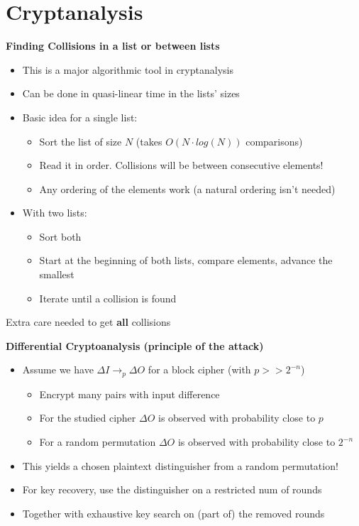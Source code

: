 

\chapter{Cryptanalysis}

\textbf{Finding Collisions in a list or between lists}
\begin{itemize}
    \item This is a major algorithmic tool in cryptanalysis
    \item Can be done in quasi-linear time in the lists’ sizes
    \item Basic idea for a single list:
    \begin{itemize}
        \item Sort the list of size $N$ (takes $O(N \cdot log(N))$ comparisons)
        \item Read it in order. Collisions will be between consecutive elements!
        \item Any ordering of the elements work (a natural ordering isn’t needed)
    \end{itemize}
    \item With two lists:
    \begin{itemize}
        \item Sort both
        \item Start at the beginning of both lists, compare elements, advance the smallest
        \item Iterate until a collision is found
    \end{itemize}
\end{itemize}
\begin{center}
    Extra care needed to get \textbf{all} collisions\newline
\end{center}


\textbf{Differential Cryptoanalysis (principle of the attack)}
\begin{itemize}
    \item Assume we have $\Delta I \to_p \Delta O$ for a block cipher (with $p >> 2^{-n}$)
    \begin{itemize}
        \item Encrypt many pairs with input difference
        \item For the studied cipher $\Delta O$ is observed with probability close to $p$
        \item For a random permutation $\Delta O$ is observed with probability close to $2^{-n}$
    \end{itemize}
    \item This yields a chosen plaintext distinguisher from a random permutation!
    \item For key recovery, use the distinguisher on a restricted num of rounds
    \item Together with exhaustive key search on (part of) the removed rounds\newline
\end{itemize}


